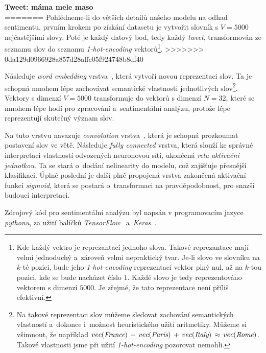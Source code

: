 \documentclass[12pt, a4paper]{article}
\numberwithin{equation}{section} 	%
\begin{document}
\textbf{Tweet: máma mele maso}\\

=======
\noindent Pohlédneme-li do větších detailů našeho modelu na odhad sentimentu, prvním krokem po získání datasetu je vytvořit slovník s $V = 5000$ nejčastějšími slovy. Poté je každý datový bod, tedy každý \textit{tweet}, transformován ze seznamu slov do seznamu \textit{1-hot-encoding} vektorů\footnote{Kde každý vektro je reprezantací jednoho slova. Takové reprezantace mají velmi jednoduchý a~zároveň velmi nepraktický tvar. Je-li slovo ve slovníku na $k$-té pozici, bude jeho \textit{1-hot-encoding} reprezentací vektor plný nul, až na $k$-tou pozici, kde se bude nacházet číslo $1$. Každé slovo je tedy reprezentováno vektorem s dimenzí $5000$. Je zřejmé, že tato reprezentace není příliš efektivní.}.
>>>>>>> 0da129d0966928a857d28affc05f924748b8df40

Následuje \textit{word embedding} vrstva~\cite{WordEmbedding1, WordEmbedding2}, která vytvoří novou reprezentaci slov. Ta je schopná mnohem lépe zachovávat semantické vlastnosti jednotlivých slov\footnote{Na takové reprezentaci slov můžeme sledovat zachování semantických vlastností a~dokonce i~možnost heuristického užití aritmetiky. Můžeme si všimnout, že například $vec(\textit{France})\nobreak\hspace{.16667em plus .08333em}-\nobreak\hspace{.16667em plus .08333em} vec(\textit{Paris})\,+\,vec(\textit{Italy})\,\approx\,vec(\textit{Rome})$. Takové vlastnosti jsme při užití \textit{1-hot-encoding} pozorovat nemohli.}. Vektory s dimenzí $V = 5000$ transformuje do vektorů s dimenzí $N = 32$, které se mnohem lépe hodí pro zpracování a~sentimentální analýzu, protože lépe reprezentují skutečný význam slov.

Na tuto vrstvu navazuje \textit{convolution} vrstva~\cite{CNN}, která je schopná prozkoumat postavení slov ve větě. Následuje \textit{fully connected} vrstva, která slouží ke správné interpretaci vlastností odvozených neuronovou sítí, ukončená \textit{relu aktivační jednotkou}. Ta se stará o~dodání nelinearity do modelu, což zajišťuje přesnější klasifikaci. Úplně poslední je další plně propojená vrstva zakončená aktivační funkcí \textit{sigmoid}, která se postará o~transformaci na pravděpodobnost, pro snazší budoucí interpretaci.

Zdrojový kód pro sentimentální analýzu byl napsán v programovacím jazyce \textit{pythonu}, za užití balíčků \textit{TensorFlow}~\cite{TensorFlow} a~\textit{Keras}~\cite{keras}.
\end{document}
